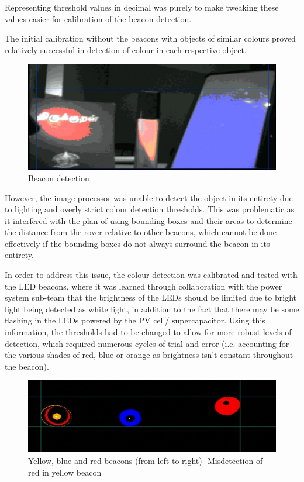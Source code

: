 Representing threshold values in decimal was purely to make tweaking these values easier for calibration of the beacon detection.

The initial calibration without the beacons with objects of similar colours proved relatively successful in detection of colour in each respective object.

\begin{figure}
    \centering
    \includegraphics{images/vision-demo.jpg}
    \caption{Beacon detection}
\end{figure}

However, the image processor was unable to detect the object in its entirety due to lighting and overly strict colour detection thresholds. This was problematic as it interfered with the plan of using bounding boxes and their areas to determine the distance from the rover relative to other beacons, which cannot be done effectively if the bounding boxes do not always surround the beacon in its entirety.

In order to address this issue, the colour detection was calibrated and tested with the LED beacons, where it was learned through collaboration with the power system sub-team that the brightness of the LEDs should be limited due to bright light being detected as white light, in addition to the fact that there may be some flashing in the LEDs powered by the PV cell/ supercapacitor. Using this information, the thresholds had to be changed to allow for more robust levels of detection, which required numerous cycles of trial and error (i.e. accounting for the various shades of red, blue or orange as brightness isn’t constant throughout the beacon).

\begin{figure}
    \centering
    \includegraphics{images/vision-detection.jpg}
    \caption{Yellow, blue and red beacons (from left to right)- Misdetection of red in yellow beacon}
\end{figure}

